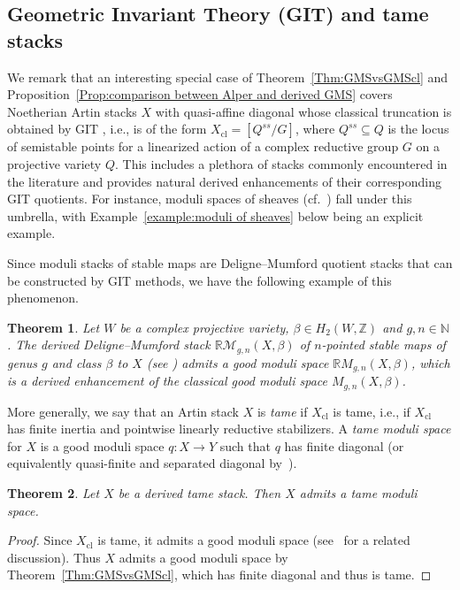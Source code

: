 \documentclass[a4paper,twoside,11pt]{amsart}
\theoremstyle{plain}
\newtheorem{theorem}{Theorem}[section]
\theoremstyle{definition}
\theoremstyle{remark}
\numberwithin{equation}{section}
\newcommand{\NN}{\mathbb{N}} %
\newcommand{\ZZ}{\mathbb{Z}} %
\newcommand{\cl}{\mathrm{cl}} %
\newcommand{\mM}{\mathcal{M}}
\begin{document}
\subsection{Geometric Invariant Theory (GIT) and tame stacks} We remark that an interesting special case of Theorem~\ref{Thm:GMSvsGMScl} and Proposition~\ref{Prop:comparison between Alper and derived GMS} covers Noetherian Artin stacks $X$ with quasi-affine diagonal whose classical truncation is obtained by GIT \cite{MFK}, i.e., is of the form $X_\cl = [Q^{ss} / G]$, where $Q^{ss} \subseteq Q$ is the locus of semistable points for a linearized action of a complex reductive group $G$ on a projective variety $Q$. This includes a plethora of stacks commonly encountered in the literature and provides natural derived enhancements of their corresponding GIT quotients. For instance, moduli spaces of sheaves (cf.~\cite{HuyLehn}) fall under this umbrella, with Example~\ref{example:moduli of sheaves} below being an explicit example.

Since moduli stacks of stable maps are Deligne--Mumford quotient stacks that can be constructed by GIT methods, we have the following example of this phenomenon.

\begin{theorem} \label{thm:3.12}
    Let $W$ be a complex projective variety, $\beta \in H_2(W,\ZZ)$ and $g,n \in \NN$. The derived Deligne--Mumford stack $\mathbb{R} \mM_{g,n}(X, \beta)$ of $n$-pointed stable maps of genus $g$ and class $\beta$ to $X$ (see \cite[Definition~2.6]{DerivedMgn}) admits a good moduli space $\mathbb{R} M_{g,n}(X, \beta)$, which is a derived enhancement of the classical good moduli space $M_{g,n}(X, \beta)$.
\end{theorem}

More generally, we say that an Artin stack $X$ is \emph{tame} if $X_\cl$ is tame, i.e., if $X_\cl$ has finite inertia and pointwise linearly reductive stabilizers. A \emph{tame moduli space} for $X$ is a good moduli space $q \colon X \to Y$ such that $q$ has finite diagonal (or equivalently quasi-finite and separated diagonal by~\cite[Theorem~8.3.2]{AlperAdequate}).

\begin{theorem}
    Let $X$ be a derived tame stack. Then $X$ admits a tame moduli space.
\end{theorem}

\begin{proof}
    Since $X_\cl$ is tame, it admits a good moduli space (see~\cite[Remark~4.2]{AlperGood} for a related discussion). Thus $X$ admits a good moduli space by Theorem~\ref{Thm:GMSvsGMScl}, which has finite diagonal and thus is tame.
\end{proof}
\end{document}
